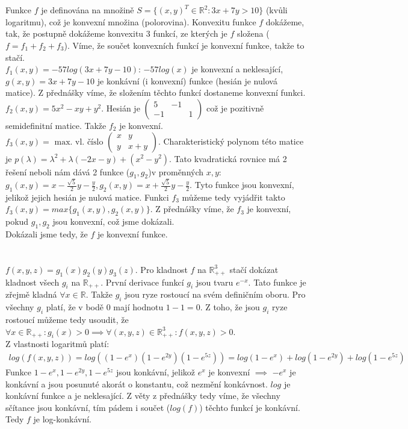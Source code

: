 \documentclass[12pt, a4paper]{article}
\begin{document}
\section{}
Funkce $f$ je definována na množině $S = \{(x,y)^T \in \mathbb{R}^2: 3x+7y>10\}$ (kvůli logaritmu), což je konvexní množina (polorovina). Konvexitu funkce $f$ dokážeme, tak, že postupně dokážeme konvexitu 3 funkcí, ze kterých je $f$ složena ($f = f_1 + f_2 + f_3$). Víme, že součet konvexních funkcí je konvexní funkce, takže to stačí.\\
$f_1(x,y) = -57log(3x+7y-10)$: $-57log(x)$ je konvexní a neklesající, $g(x,y) = 3x+7y-10$ je konkávní (i konvexní) funkce (hesián je nulová matice). Z přednášky víme, že složením těchto funkcí dostaneme konvexní funkci.\\
$f_2(x,y) = 5x^2-xy+y^2$. Hesián je $\begin{pmatrix}
5 & -1\\
-1 && 1
\end{pmatrix}$
což je pozitivně semidefinitní matice. Takže $f_2$ je konvexní.
$f_3(x,y) = \text{ max. vl. číslo } \begin{pmatrix}
x & y\\
y & x+y
\end{pmatrix}$. Charakteristický polynom této matice je $p(\lambda)=\lambda^2 + \lambda(-2x-y) + (x^2-y^2)$. Tato kvadratická rovnice má 2 řešení neboli nám dává 2 funkce ($g_1,g_2$)v proměnných $x,y$: $g_1(x,y)=x-\frac{\sqrt{5}}{2}y-\frac{y}{2}, g_2(x,y)=x+\frac{\sqrt{5}}{2}y-\frac{y}{2}$. Tyto funkce jsou konvexní, jelikož jejich hesián je nulová matice. Funkci $f_3$ můžeme tedy vyjádřit takto $f_3(x,y)=max\{g_1(x,y),g_2(x,y)\}$. Z přednášky víme, že $f_3$ je konvexní, pokud $g_1,g_2$ jsou konvexní, což jsme dokázali.\\
Dokázali jsme tedy, že $f$ je konvexní funkce.

\section{}
$f(x,y,z) = g_1(x)g_2(y)g_3(z)$. Pro kladnost $f$ na $\mathbb{R}^3_{++}$ stačí dokázat kladnost všech $g_i$ na $\mathbb{R}_{++}$. První derivace funkcí $g_i$ jsou tvaru $e^{-x}$. Tato funkce je zřejmě kladná $\forall x \in \mathbb{R}$. Takže $g_i$ jsou ryze rostoucí na svém definičním oboru. Pro všechny $g_i$ platí, že v bodě $0$ mají hodnotu $1-1=0$. Z toho, že jsou $g_i$ ryze rostoucí můžeme tedy usoudit, že $\forall x \in \mathbb{R}_{++}: g_i(x)>0 \implies \forall (x,y,z) \in \mathbb{R}^3_{++}: f(x,y,z)>0$.\\
Z vlastnosti logaritmů platí:
\begin{gather*}
log(f(x,y,z))=log((1-e^x)(1-e^{2y})(1-e^{5z}))=log(1-e^x)+log(1-e^{2y})+log(1-e^{5z})
\end{gather*}
Funkce $1-e^x, 1-e^{2y}, 1-e^{5z}$ jsou konkávní, jelikož $e^x$ je konvexní $\implies$ $-e^x$ je konkávní a jsou posunuté akorát o konstantu, což nezmění konkávnost. $log$ je konkávní funkce a je neklesající. Z věty z přednášky tedy víme, že všechny sčítance jsou konkávní, tím pádem i součet ($log(f)$) těchto funkcí je konkávní. Tedy $f$ je log-konkávní.
\end{document}
